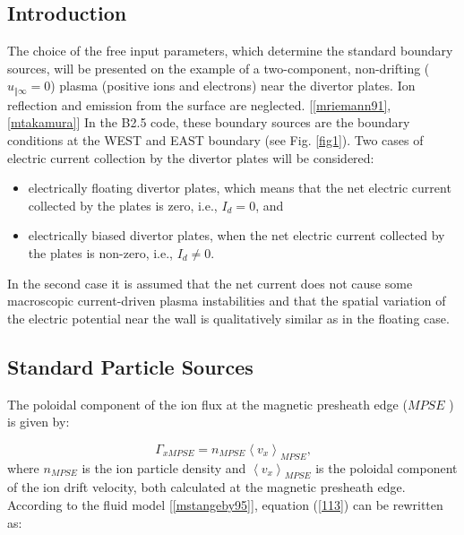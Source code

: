 \documentclass[11pt]{article}
\begin{document}
\bigskip

\subsection{Introduction}

\bigskip

The choice of the free input parameters, which determine the standard
boundary sources, will be presented on the example of a two-component,
non-drifting ($u_{\Vert\infty}=0$) plasma (positive ions and electrons) near
the divertor plates. Ion reflection and emission from the surface are
neglected. [\ref{mriemann91}, \ref{mtakamura}] In the B2.5 code, these
boundary sources are the boundary conditions at the WEST and EAST boundary
(see Fig. \ref{fig1}). Two cases of electric current collection by the
divertor plates will be considered:

\begin{itemize}
\item  electrically floating divertor plates, which means that the net
electric current collected by the plates is zero, i.e., $I_{d}=0$, and

\item  electrically biased divertor plates, when the net electric current
collected by the plates is non-zero, i.e., $I_{d}\neq0$.
\end{itemize}

\bigskip

In the second case it is assumed that the net current does not cause some
macroscopic current-driven plasma instabilities and that the spatial
variation of the electric potential near the wall is qualitatively similar
as in the floating case.

\bigskip

\subsection{Standard Particle Sources}

\bigskip

The poloidal component of the ion flux at the magnetic presheath edge ($MPSE$%
) is given by:

\begin{equation}
\Gamma_{xMPSE}=n_{MPSE}\left\langle v_{x}\right\rangle _{MPSE}\text{,} 
\label{113}
\end{equation}
where $n_{MPSE}$ is the ion particle density and $\left\langle
v_{x}\right\rangle _{MPSE}$ is the poloidal component of the ion drift
velocity, both calculated at the magnetic presheath edge. According to the
fluid model [\ref{mstangeby95}], equation (\ref{113}) can be rewritten as:
\end{document}
